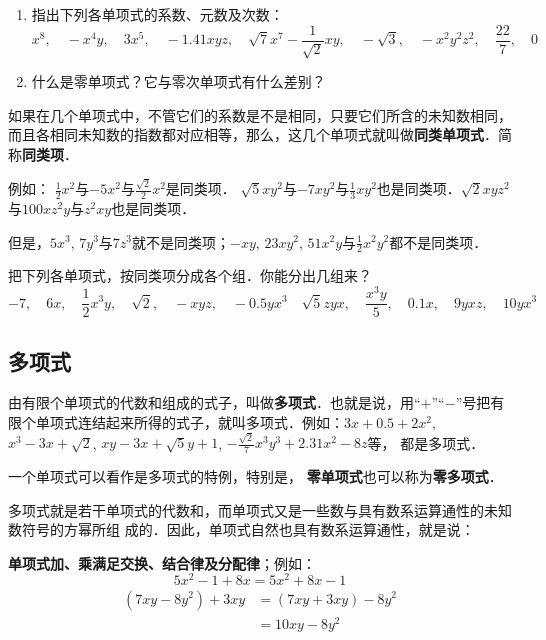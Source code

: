 \begin{ex}
  \begin{enumerate}
      \item 指出下列各单项式的系数、元数及次数：
      \[x^8,\quad -x^4y,\quad 3x^5,\quad -1.41xyz, \quad \sqrt{7}x^7 
      -\frac{1}{\sqrt{2}}xy,\quad -\sqrt{3},\quad -x^2y^2z^2,\quad \frac{22}{7},\quad 0 \]
      \item 什么是零单项式？它与零次单项式有什么差别？
  \end{enumerate} 
\end{ex}

如果在几个单项式中，不管它们的系数是不是相同，只要它们所含的未知数相同，而且各相同未知数的指数都对应相等，那么，这几个单项式就叫做\textbf{同类单项式}．简称\textbf{同类项}．

例如：
$\frac{1}{2}x^2$与$-5x^2$与$\frac{\sqrt{2}}{2}x^2$是同类项．
$\sqrt{5}xy^2$与$-7xy^2$与$\frac{1}{3}xy^2$也是同类项．$\sqrt{2}xyz^2$与$100xz^2y$与$z^2xy$也是同类项．

但是，$5x^3$, $7y^3$与$7z^3$就不是同类项；$-xy$,
$23xy^2$, $51x^2y$与$\frac{1}{2}x^2y^2$都不是同类项．

\begin{ex}
    把下列各单项式，按同类项分成各个组．你能分出几组来？
\[-7,\quad  6x,\quad \frac{1}{2}x^3y,\quad \sqrt{2},\quad -xyz,\quad -0.5yx^3 \quad
\sqrt{5}zyx,\quad \frac{x^3y}{5},\quad 0.1x,\quad 9yxz,\quad 10yx^3 \]
\end{ex}



\subsection{多项式}
由有限个单项式的代数和组成的式子，叫做\textbf{多项式}．也就是说，用“$+$”“$-$”号把有限个单项式连结起来所得的式子，就叫多项式．例如：$3x+0.5+2x^2$, $x^3-3x+\sqrt{2}$, $xy-3x+\sqrt{5}y+1$, $-\frac{\sqrt{2}}{7}x^3y^3+2.31x^2-8z$等，
都是多项式．

一个单项式可以看作是多项式的特例，特别是，
\textbf{零单项式}也可以称为\textbf{零多项式}．

多项式就是若干单项式的代数和，而单项式又是一些数与具有数系运算通性的未知数符号的方幂所组
成的．因此，单项式自然也具有数系运算通性，就是说：

\textbf{单项式加、乘满足交换、结合律及分配律}；例如：
\begin{equation*}
    5x^2-1+8x=5x^2+8x-1 \tag{交换律}
\end{equation*}
\begin{align*}
(7xy-8y^2)+3xy &=(7xy+3xy)-8y^2 \tag{交换律，结合律}\\
&=10xy-8y^2 \tag{分配律}
\end{align*}

